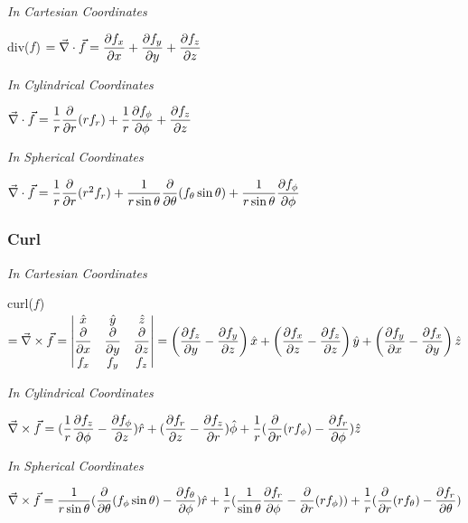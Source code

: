 \textit{In Cartesian Coordinates}
\begin{itemize}
\itemt div($f$) \( = \vec{\nabla}\cdot{\vec{f}} = \dfrac{\partial f_x}{\partial x} + \dfrac{\partial f_y}{\partial y} + \dfrac{\partial f_z}{\partial z} \)
\end{itemize}

\textit{In Cylindrical Coordinates}
\begin{itemize}
\itemt\( \vec{\nabla}\cdot{\vec{f}} = \dfrac{1}{r}\dfrac{\partial }{\partial r}(rf_r) + \dfrac{1}{r}\dfrac{\partial f_\phi}{\partial \phi} + \dfrac{\partial f_z}{\partial z} \)
\end{itemize}

\textit{In Spherical Coordinates}
\begin{itemize}
\itemt\( \vec{\nabla}\cdot{\vec{f}} = \dfrac{1}{r}\dfrac{\partial }{\partial r}(r^2f_r) + \dfrac{1}{r\sin\theta}\dfrac{\partial }{\partial \theta}(f_\theta \sin\theta) + \dfrac{1}{r\sin\theta}\dfrac{\partial f_\phi}{\partial \phi} \)
\end{itemize}

\subsubsection{Curl}
\def\arraystretch{1.5}
\textit{\hspace*{0.4cm} In Cartesian Coordinates}
\begin{itemize}
\itemt curl($f$) \( = \vec{\nabla}\times\vec{f} = 
\begin{vmatrix}
\hat{x} 	& \hat{y} 		& \hat{z} \\
\dfrac{\partial }{\partial x} & \dfrac{\partial }{\partial y} 	& \dfrac{\partial }{\partial z} \\
f_x			& f_y 			& f_z
\end{vmatrix}        
	= \left(\dfrac{\partial f_z}{\partial y} - \dfrac{\partial f_y}{\partial z}\right)\hat{x} + \left(\dfrac{\partial f_x}{\partial z} - \dfrac{\partial f_z}{\partial z}\right)\hat{y} + \left(\dfrac{\partial f_y}{\partial x} - \dfrac{\partial f_x}{\partial y}\right)\hat{z} \)
\end{itemize}

\textit{In Cylindrical Coordinates}
\begin{itemize}
\itemt \( \vec{\nabla}\times\vec{f} = (\dfrac{1}{r} \dfrac{\partial f_z}{\partial \phi} - \dfrac{\partial f_\phi}{\partial z})\hat{r} + (\dfrac{\partial f_r}{\partial z} - \dfrac{\partial f_z}{\partial r})\hat{\phi} + \dfrac{1}{r} (\dfrac{\partial }{\partial r} (r f_\phi) - \dfrac{\partial f_r}{\partial \phi})\hat{z} \)
\end{itemize}

\textit{In Spherical Coordinates}                
\begin{itemize}
\itemt \( \vec{\nabla}\times\vec{f} = \dfrac{1}{r\sin\theta} (\dfrac{\partial }{\partial \theta} (f_\phi \sin\theta) - \dfrac{\partial f_\theta}{\partial \phi})\hat{r} + \dfrac{1}{r}(\dfrac{1}{\sin\theta} \dfrac{\partial f_r}{\partial \phi} - \dfrac{\partial }{\partial r} (rf_\phi)) + \dfrac{1}{r}(\dfrac{\partial }{\partial r}(rf_\theta) - \dfrac{\partial f_r}{\partial \theta})\)
\end{itemize}


